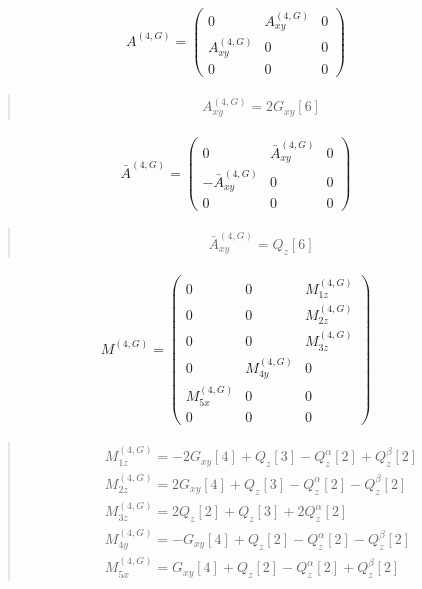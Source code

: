 \documentclass[fleqn,10pt]{jsarticle}
\begin{document}
\begin{align*}
A^{(4,G)} = \begin{pmatrix} 0 & A^{(4,G)}_{xy} & 0 \\ A^{(4,G)}_{xy} & 0 & 0 \\ 0 & 0 & 0 \end{pmatrix}
\end{align*}
\begin{quote}
\begin{align*}
& A^{(4,G)}_{xy} = 2 G_{xy}[6]
\end{align*}
\end{quote}
\begin{align*}
\bar{A}^{(4,G)} = \begin{pmatrix} 0 & \bar{A}^{(4,G)}_{xy} & 0 \\ - \bar{A}^{(4,G)}_{xy} & 0 & 0 \\ 0 & 0 & 0 \end{pmatrix}
\end{align*}
\begin{quote}
\begin{align*}
& \bar{A}^{(4,G)}_{xy} = Q_{z}[6]
\end{align*}
\end{quote}
\begin{align*}
M^{(4,G)} = \begin{pmatrix} 0 & 0 & M^{(4,G)}_{1z} \\ 0 & 0 & M^{(4,G)}_{2z} \\ 0 & 0 & M^{(4,G)}_{3z} \\ 0 & M^{(4,G)}_{4y} & 0 \\ M^{(4,G)}_{5x} & 0 & 0 \\ 0 & 0 & 0 \end{pmatrix}
\end{align*}
\begin{quote}
\begin{align*}
& M^{(4,G)}_{1z} = - 2 G_{xy}[4] + Q_{z}[3] - Q_{z}^{\alpha}[2] + Q_{z}^{\beta}[2] \\
& M^{(4,G)}_{2z} = 2 G_{xy}[4] + Q_{z}[3] - Q_{z}^{\alpha}[2] - Q_{z}^{\beta}[2] \\
& M^{(4,G)}_{3z} = 2 Q_{z}[2] + Q_{z}[3] + 2 Q_{z}^{\alpha}[2] \\
& M^{(4,G)}_{4y} = - G_{xy}[4] + Q_{z}[2] - Q_{z}^{\alpha}[2] - Q_{z}^{\beta}[2] \\
& M^{(4,G)}_{5x} = G_{xy}[4] + Q_{z}[2] - Q_{z}^{\alpha}[2] + Q_{z}^{\beta}[2]
\end{align*}
\end{quote}
\end{document}
